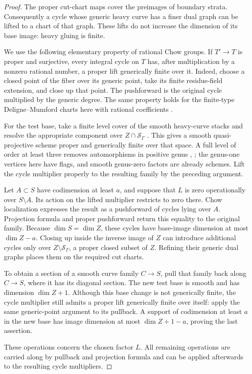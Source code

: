 \begin{proof}
The proper cut-chart maps cover the preimages of boundary strata.
Consequently a cycle whose generic heavy curve has a finer dual graph
can be lifted to a chart of that graph.  These lifts do not increase the
dimension of its base image: heavy gluing is finite.

We use the following elementary property of rational Chow groups.  If
\(T'\to T\) is proper and surjective, every integral cycle on \(T\) has,
after multiplication by a nonzero rational number, a proper lift
generically finite over it.  Indeed, choose a closed point of the fiber
over its generic point, take its finite residue-field extension, and
close up that point.  The pushforward is the original cycle multiplied
by the generic degree.  The same property holds for the finite-type Deligne--Mumford charts
here with rational coefficients \cite[Proposition~B.19]{BaeSchmitt}.

For the test base, take a finite level cover of the smooth heavy-curve
stacks and resolve the appropriate component over
\(Z\cap\mathcal S_\Gamma\)
\cite[Theorems~1.0.2 and~1.0.3]{Wlodarczyk}.  This gives a smooth quasi-projective scheme
proper and generically finite over that space.  A full level of order at least three removes automorphisms in positive
genus \cite[Sections~5.3--5.4 and~5.14]{DeligneMumford},
\cite[IV.2.7--2.9 and IV.3.1--3.2]{DeligneRapoport}; the genus-one
vertices here have flags, and smooth genus-zero factors are already
schemes.  Lift the cycle multiplier properly to the resulting family by
the preceding argument.

Let \(A\subset S\) have codimension at least \(a\), and suppose that \(L\)
is zero operationally over \(S\setminus A\).  Its action on the lifted
multiplier restricts to zero there.  Chow localization expresses the
result as a pushforward of cycles lying over \(A\).  Projection formula
and proper pushforward return this equality to the original family.
Because \(\dim S=\dim Z\), these cycles have base-image dimension at most
\(\dim Z-a\).  Closing up inside the inverse image of \(Z\) can introduce
additional cycles only over \(Z\setminus\mathcal S_\Gamma\), a proper
closed subset of \(Z\).  Refining their generic dual graphs places them
on the required cut charts.

To obtain a section of a smooth curve family \(C\to S\), pull that
family back along \(C\to S\), where it has its diagonal section.
The new test base is smooth and has dimension \(\dim Z+1\).
Although this base change is not generically finite, the cycle multiplier
still admits a proper lift generically finite over itself: apply the
same generic-point argument to its pullback.  A support of codimension
at least \(a\) in the new base has image dimension at most
\(\dim Z+1-a\), proving the last assertion.

These operations concern the chosen factor \(L\).  All remaining
operations are carried along by pullback and projection formula and can
be applied afterwards to the resulting cycle multipliers.
\end{proof}


